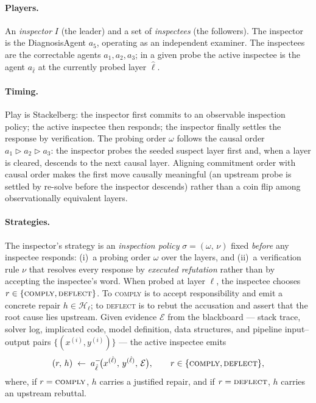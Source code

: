 \documentclass[a4paper,fleqn]{cas-sc}
\newcommand{\Ecal}{\mathcal{E}}
\newcommand{\tri}{\triangleright}
\begin{document}
\paragraph{Players.} An \emph{inspector} $I$ (the leader) and a set of
\emph{inspectees} (the followers). The inspector is the DiagnosisAgent $a_5$,
operating as an independent examiner. The inspectees are the correctable
agents $a_1,a_2,a_3$; in a given probe the active inspectee is the agent
$a_{\hat{\ell}}$ at the currently probed layer $\hat{\ell}$.

\paragraph{Timing.} Play is Stackelberg: the inspector first commits to an
observable inspection policy; the active inspectee then responds; the
inspector finally settles the response by verification. The probing order
$\omega$ follows the causal order $a_1\tri a_2\tri a_3$: the inspector probes
the seeded suspect layer first and, when a layer is cleared, descends to the
next causal layer. Aligning commitment order with causal order makes the
first move causally meaningful (an upstream probe is settled by re-solve
before the inspector descends) rather than a coin flip among
observationally equivalent layers.

\paragraph{Strategies.} The inspector's strategy is an \emph{inspection
policy} $\sigma=(\omega,\,\nu)$ fixed \emph{before} any inspectee responds:
(i)~a probing order $\omega$ over the layers, and (ii)~a verification rule
$\nu$ that resolves every response by \emph{executed refutation} rather than
by accepting the inspectee's word. When probed at layer $\ell$, the inspectee
chooses
$r\in\{\textsc{comply},\textsc{deflect}\}$. To \textsc{comply} is to accept
responsibility and emit a concrete repair $h\in\mathcal{H}_{\ell}$; to
\textsc{deflect} is to rebut the accusation and assert that the root cause
lies upstream. Given evidence $\Ecal$ from the blackboard --- stack trace,
solver log, implicated code, model definition, data structures, and pipeline
input--output pairs $\{(x^{(i)},y^{(i)})\}$ --- the active inspectee emits
\begin{equation}\label{eq:inspectee}
(r,\,h)\;\gets\; a_{\hat{\ell}}^{-}\!\bigl(x^{(\hat{\ell})},\,y^{(\hat{\ell})},\,\Ecal\bigr),
\qquad r\in\{\textsc{comply},\textsc{deflect}\},
\end{equation}
where, if $r=\textsc{comply}$, $h$ carries a justified repair, and if
$r=\textsc{deflect}$, $h$ carries an upstream rebuttal.
\end{document}
